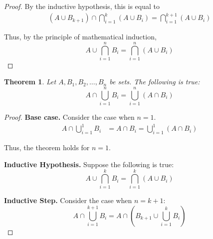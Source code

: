 \documentclass{article}
\newtheorem{theorem}{Theorem}
\numberwithin{subcase}{case}
\begin{document}
\begin{outline}[enumerate]
\begin{proof}
        By the inductive hypothesis, this is equal to
        \begin{equation}
            \begin{aligned}
                \left(A \cup B_{k+1}\right) \cap \bigcap\limits^k_{i=1} (A \cup B_i) = \bigcap\limits^{k+1}_{i=1} (A \cup B_i) 
            \end{aligned}
        \end{equation}

        Thus, by the principle of mathematical induction, 
        \begin{equation}
            A \cup \bigcap\limits^{n}_{i=1} B_i = \bigcap\limits^n_{i=1} (A \cup B_i)               
        \end{equation}

    \end{proof}

    \2 \begin{theorem}
        Let $A, B_1, B_2, \dots, B_n$ be sets. The following is true:
        \begin{equation}
            A \cap \bigcup\limits^{n}_{i=1} B_i = \bigcup\limits^n_{i=1} (A \cap B_i)               
        \end{equation}
    \end{theorem}

    \begin{proof}
        \textbf{Base case.} Consider the case when $n = 1$.
        \begin{equation}
            \begin{aligned}
                A \cap \bigcup\limits^{1}_{i=1} B_i &= A \cap B_i = \bigcup\limits^{1}_{i=1} (A \cap B_i)
            \end{aligned}
        \end{equation}

        Thus, the theorem holds for $n = 1$.

        \textbf{Inductive Hypothesis.} Suppose the following is true:
        \begin{equation}
            A \cup \bigcap\limits^{k}_{i=1} B_i = \bigcap\limits^k_{i=1} (A \cup B_i)
        \end{equation}

        \textbf{Inductive Step.} Consider the case when $n = k + 1$:
        \begin{equation}
            A\cap \bigcup\limits^{k + 1}_{i=1} B_i
            = A \cap \left( B_{k+1} \cup \bigcup\limits^{k}_{i=1} B_i \right) 
        \end{equation}


\end{proof}
\end{outline}
\end{document}
